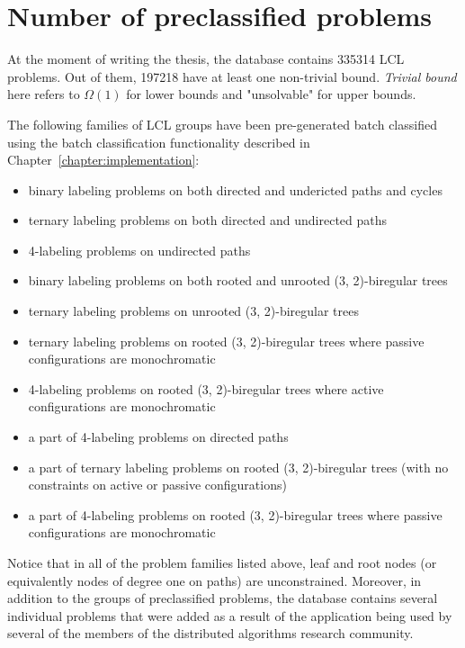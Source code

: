 



\section{Number of preclassified problems}

At the moment of writing the thesis, the database contains 335314
LCL problems. Out of them, 197218 have at least one non-trivial bound. \emph{Trivial bound} here
refers to $\Omega(1)$ for lower bounds and "unsolvable" for upper bounds.

The following families of LCL groups have been pre-generated batch classified
using the batch classification functionality described in Chapter~\ref{chapter:implementation}:

\begin{itemize}
  \item binary labeling problems on both directed and undericted paths and cycles
  \item ternary labeling problems on both directed and undirected paths
  \item 4-labeling problems on undirected paths
  \item binary labeling problems on both rooted and unrooted (3, 2)-biregular trees
  \item ternary labeling problems on unrooted (3, 2)-biregular trees
  \item ternary labeling problems on rooted (3, 2)-biregular trees where passive configurations are monochromatic
  \item 4-labeling problems on rooted (3, 2)-biregular trees where active configurations are monochromatic
  \item a part of 4-labeling problems on directed paths
  \item a part of ternary labeling problems on rooted (3, 2)-biregular trees (with no constraints on active or passive configurations)
  \item a part of 4-labeling problems on rooted (3, 2)-biregular trees where passive configurations are monochromatic
\end{itemize}
Notice that in all of the problem families listed above, leaf and root nodes
(or equivalently nodes of degree one on paths) are unconstrained. Moreover, in addition to the
groups of preclassified problems, the database contains several individual problems that
were added as a result of the application being used by several of the members of the
distributed algorithms research community.

